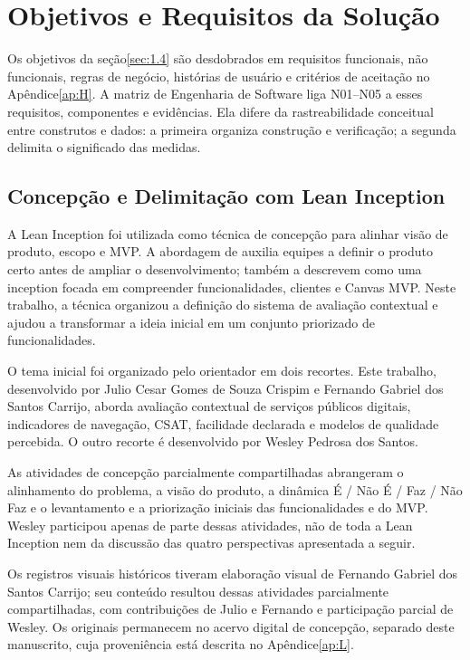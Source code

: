 \section{Objetivos e Requisitos da Solução}
\label{sec:3.3}

Os objetivos da seção\nobreakspace{}\ref{sec:1.4} são desdobrados em requisitos funcionais, não funcionais, regras de negócio, histórias de usuário e critérios de aceitação no Apêndice\nobreakspace{}\ref{ap:H}. A matriz de Engenharia de Software liga N01--N05 a esses requisitos, componentes e evidências. Ela difere da rastreabilidade conceitual entre construtos e dados: a primeira organiza construção e verificação; a segunda delimita o significado das medidas.

\subsection{Concepção e Delimitação com Lean Inception}
\label{sec:3.3.1}

A Lean Inception foi utilizada como técnica de concepção para alinhar visão de produto, escopo e MVP. A abordagem de  auxilia equipes a definir o produto certo antes de ampliar o desenvolvimento;  também a descrevem como uma inception focada em compreender funcionalidades, clientes e Canvas MVP. Neste trabalho, a técnica organizou a definição do sistema de avaliação contextual e ajudou a transformar a ideia inicial em um conjunto priorizado de funcionalidades.

O tema inicial foi organizado pelo orientador em dois recortes. Este trabalho, desenvolvido por Julio Cesar Gomes de Souza Crispim e Fernando Gabriel dos Santos Carrijo, aborda avaliação contextual de serviços públicos digitais, indicadores de navegação, CSAT, facilidade declarada e modelos de qualidade percebida. O outro recorte é desenvolvido por Wesley Pedrosa dos Santos.

As atividades de concepção parcialmente compartilhadas abrangeram o alinhamento do problema, a visão do produto, a dinâmica É / Não É / Faz / Não Faz e o levantamento e a priorização iniciais das funcionalidades e do MVP. Wesley participou apenas de parte dessas atividades, não de toda a Lean Inception nem da discussão das quatro perspectivas apresentada a seguir.

Os registros visuais históricos tiveram elaboração visual de Fernando Gabriel dos Santos Carrijo; seu conteúdo resultou dessas atividades parcialmente compartilhadas, com contribuições de Julio e Fernando e participação parcial de Wesley. Os originais permanecem no acervo digital de concepção, separado deste manuscrito, cuja proveniência está descrita no Apêndice\nobreakspace{}\ref{ap:L}.


